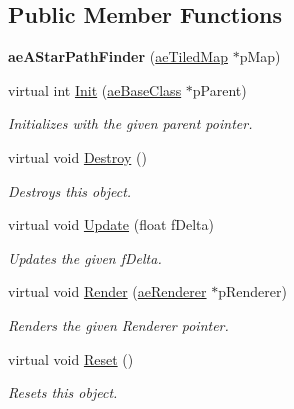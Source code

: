 \subsection*{Public Member Functions}
\begin{DoxyCompactItemize}
\item 
{\bfseries ae\+A\+Star\+Path\+Finder} (\hyperlink{classae_tiled_map}{ae\+Tiled\+Map} $\ast$p\+Map)\hypertarget{classae_a_star_path_finder_ab91a80de31e37c0fb9a062b800e12568}{}\label{classae_a_star_path_finder_ab91a80de31e37c0fb9a062b800e12568}

\item 
virtual int \hyperlink{classae_a_star_path_finder_ad8de2ad34565b3870ab6ed8c7235cd71}{Init} (\hyperlink{classae_base_class}{ae\+Base\+Class} $\ast$p\+Parent)
\begin{DoxyCompactList}\small\item\em Initializes with the given parent pointer. \end{DoxyCompactList}\item 
virtual void \hyperlink{classae_a_star_path_finder_a54e53b0396e46112c69b03a34eaf3900}{Destroy} ()\hypertarget{classae_a_star_path_finder_a54e53b0396e46112c69b03a34eaf3900}{}\label{classae_a_star_path_finder_a54e53b0396e46112c69b03a34eaf3900}

\begin{DoxyCompactList}\small\item\em Destroys this object. \end{DoxyCompactList}\item 
virtual void \hyperlink{classae_a_star_path_finder_a21c5d9395cfb810272c89310d037fe15}{Update} (float f\+Delta)
\begin{DoxyCompactList}\small\item\em Updates the given f\+Delta. \end{DoxyCompactList}\item 
virtual void \hyperlink{classae_a_star_path_finder_abfe51663cc9eb452b02b80f335d1c7b0}{Render} (\hyperlink{classae_core_1_1ae_renderer}{ae\+Renderer} $\ast$p\+Renderer)
\begin{DoxyCompactList}\small\item\em Renders the given Renderer pointer. \end{DoxyCompactList}\item 
virtual void \hyperlink{classae_a_star_path_finder_a863caf99db47beef104b3315dde43a45}{Reset} ()\hypertarget{classae_a_star_path_finder_a863caf99db47beef104b3315dde43a45}{}\label{classae_a_star_path_finder_a863caf99db47beef104b3315dde43a45}

\begin{DoxyCompactList}\small\item\em Resets this object. \end{DoxyCompactList}\end{DoxyCompactItemize}
